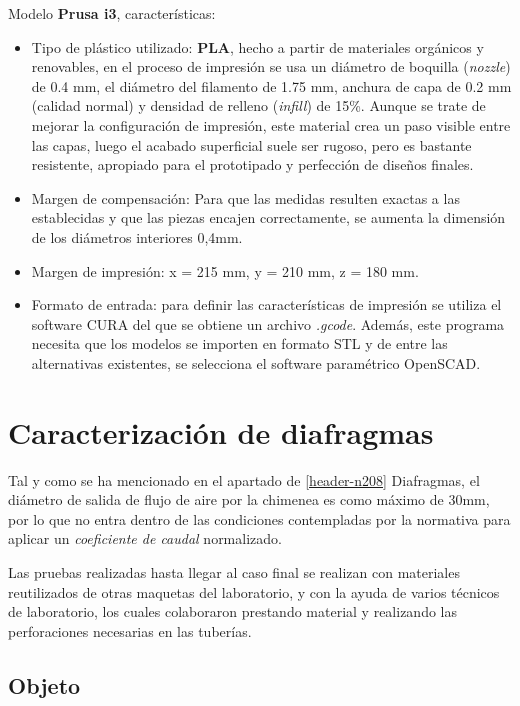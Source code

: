 Modelo \textbf{Prusa i3}, características:

\begin{itemize}
\item
  Tipo de plástico utilizado: \textbf{PLA}, hecho a partir de materiales
  orgánicos y renovables, en el proceso de impresión se usa un diámetro
  de boquilla (\emph{nozzle}) de 0.4 mm, el diámetro del filamento de
  1.75 mm, anchura de capa de 0.2 mm (calidad normal) y densidad de
  relleno (\emph{infill}) de 15\%. Aunque se trate de mejorar la
  configuración de impresión, este material crea un paso visible entre
  las capas, luego el acabado superficial suele ser rugoso, pero es
  bastante resistente, apropiado para el prototipado y perfección de
  diseños finales.
\item
  Margen de compensación: Para que las medidas resulten exactas a las
  establecidas y que las piezas encajen correctamente, se aumenta la
  dimensión de los diámetros interiores 0,4mm.
\item
  Margen de impresión: x = 215 mm, y = 210 mm, z = 180 mm.\\
\item
  Formato de entrada: para definir las características de impresión se
  utiliza el software CURA del que se obtiene un archivo \emph{.gcode}.
  Además, este programa necesita que los modelos se importen en formato
  STL y de entre las alternativas existentes, se selecciona el software
  paramétrico OpenSCAD.
\end{itemize}

\section{Caracterización de diafragmas}\label{header-n239}

Tal y como se ha mencionado en el apartado de \ref{header-n208} Diafragmas, el
diámetro de salida de flujo de aire por la chimenea es como máximo de
30mm, por lo que no entra dentro de las condiciones contempladas por la
normativa para aplicar un \emph{coeficiente de caudal} normalizado.

Las pruebas realizadas hasta llegar al caso final se realizan con
materiales reutilizados de otras maquetas del laboratorio, y con la
ayuda de varios técnicos de laboratorio, los cuales colaboraron
prestando material y realizando las perforaciones necesarias en las
tuberías.

\subsection{Objeto}\label{header-n246}

